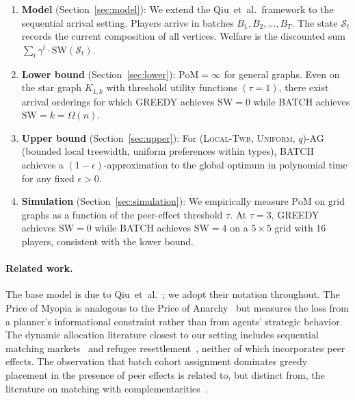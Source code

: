 \documentclass[11pt]{article}
\newcommand{\SW}{\mathrm{SW}}
\newcommand{\PoM}{\mathrm{PoM}}
\begin{document}
\begin{enumerate}[label=(\roman*)]
  \item \textbf{Model} (Section~\ref{sec:model}): We extend the Qiu~et~al.\ framework
    to the sequential arrival setting.
    Players arrive in batches $B_1, B_2, \ldots, B_T$.
    The state $\mathcal{S}_t$ records the current composition of all vertices.
    Welfare is the discounted sum $\sum_t \gamma^t \cdot \SW(\mathcal{S}_t)$.

  \item \textbf{Lower bound} (Section~\ref{sec:lower}): $\PoM = \infty$ for general
    graphs. Even on the star graph $K_{1,k}$ with threshold utility functions
    $(\tau=1)$, there exist arrival orderings for which GREEDY achieves $\SW = 0$
    while BATCH achieves $\SW = k = \Omega(n)$.

  \item \textbf{Upper bound} (Section~\ref{sec:upper}): For
    (\textsc{Local-Twb}, \textsc{Uniform}, $q$)-AG (bounded local treewidth, uniform
    preferences within types), BATCH achieves a $(1-\epsilon)$-approximation to the
    global optimum in polynomial time for any fixed $\epsilon > 0$.

  \item \textbf{Simulation} (Section~\ref{sec:simulation}): We empirically measure
    $\PoM$ on grid graphs as a function of the peer-effect threshold $\tau$.
    At $\tau = 3$, GREEDY achieves $\SW = 0$ while BATCH achieves $\SW = 4$ on a
    $5\times 5$ grid with 16 players, consistent with the lower bound.
\end{enumerate}

\paragraph{Related work.}
The base model is due to Qiu~et~al.~\cite{qiu2025welfare}; we adopt their notation
throughout.
The Price of Myopia is analogous to the Price of Anarchy~\cite{roughgarden2010} but
measures the loss from a planner's informational constraint rather than from
agents' strategic behavior.
The dynamic allocation literature closest to our setting includes sequential matching
markets~\cite{anderson2017} and refugee resettlement~\cite{bansak2018,andersson2023},
neither of which incorporates peer effects.
The observation that batch cohort assignment dominates greedy placement in the presence
of peer effects is related to, but distinct from, the literature on matching with
complementarities~\cite{hatfield2005}.
\end{document}

